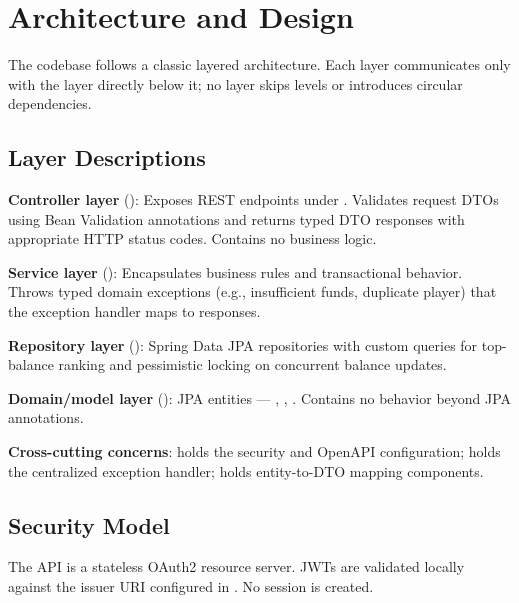 \section{Architecture and Design}

The codebase follows a classic layered architecture. Each layer communicates only with the layer directly below it; no layer skips levels or introduces circular dependencies.

\subsection{Layer Descriptions}

\textbf{Controller layer} (): Exposes REST endpoints under . Validates request DTOs using Bean Validation annotations and returns typed DTO responses with appropriate HTTP status codes. Contains no business logic.

\textbf{Service layer} (): Encapsulates business rules and transactional behavior. Throws typed domain exceptions (e.g., insufficient funds, duplicate player) that the exception handler maps to  responses.

\textbf{Repository layer} (): Spring Data JPA repositories with custom queries for top-balance ranking and pessimistic locking on concurrent balance updates.

\textbf{Domain/model layer} (): JPA entities — , , . Contains no behavior beyond JPA annotations.

\textbf{Cross-cutting concerns}:  holds the security and OpenAPI configuration;  holds the centralized exception handler;  holds entity-to-DTO mapping components.

\subsection{Security Model}

The API is a stateless OAuth2 resource server. JWTs are validated locally against the issuer URI configured in . No session is created.

